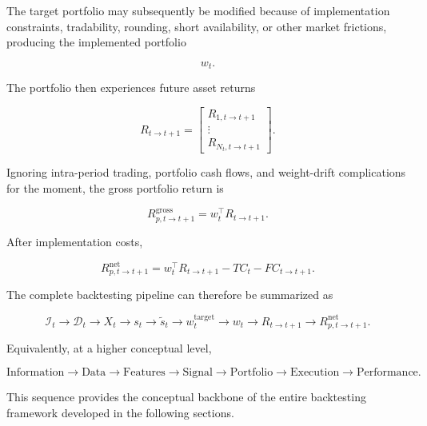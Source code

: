 \documentclass[11pt,a4paper]{article}
\begin{document}
The target portfolio may subsequently be modified because of implementation
constraints, tradability, rounding, short availability, or other market
frictions, producing the implemented portfolio

\begin{equation}
w_t.
\end{equation}

The portfolio then experiences future asset returns

\begin{equation}
R_{t\rightarrow t+1}
=
\begin{bmatrix}
R_{1,t\rightarrow t+1}\\
\vdots\\
R_{N_t,t\rightarrow t+1}
\end{bmatrix}.
\end{equation}

Ignoring intra-period trading, portfolio cash flows, and weight-drift
complications for the moment, the gross portfolio return is

\begin{equation}
\boxed{
R_{p,t\rightarrow t+1}^{\mathrm{gross}}
=
w_t^\top
R_{t\rightarrow t+1}.
}
\end{equation}

After implementation costs,

\begin{equation}
\boxed{
R_{p,t\rightarrow t+1}^{\mathrm{net}}
=
w_t^\top
R_{t\rightarrow t+1}
-
TC_t
-
FC_{t\rightarrow t+1}.
}
\end{equation}

The complete backtesting pipeline can therefore be summarized as

\begin{equation}
\boxed{
\mathcal{I}_t
\rightarrow
\mathcal{D}_t
\rightarrow
X_t
\rightarrow
s_t
\rightarrow
\widetilde{s}_t
\rightarrow
w_t^{\mathrm{target}}
\rightarrow
w_t
\rightarrow
R_{t\rightarrow t+1}
\rightarrow
R_{p,t\rightarrow t+1}^{\mathrm{net}}.
}
\end{equation}

Equivalently, at a higher conceptual level,

\begin{equation}
\boxed{
\text{Information}
\rightarrow
\text{Data}
\rightarrow
\text{Features}
\rightarrow
\text{Signal}
\rightarrow
\text{Portfolio}
\rightarrow
\text{Execution}
\rightarrow
\text{Performance}.
}
\end{equation}

This sequence provides the conceptual backbone of the entire backtesting
framework developed in the following sections.
\end{document}
